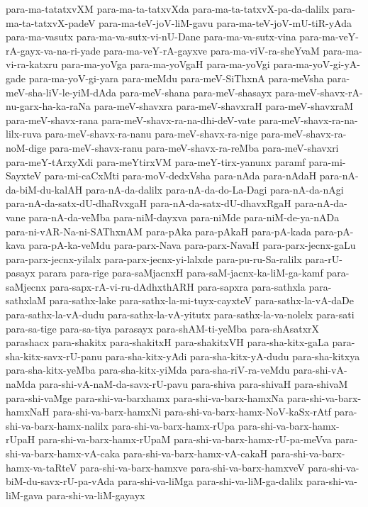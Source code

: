 {para-ma-tatatxvXM
para-ma-ta-tatxvXda
para-ma-ta-tatxvX-pa-da-dalilx
para-ma-ta-tatxvX-padeV
para-ma-teV-joV-liM-gavu
para-ma-teV-joV-mU-tiR-yAda
para-ma-vasutx
para-ma-va-sutx-vi-nU-Dane
para-ma-va-sutx-vina
para-ma-veY-rA-gayx-va-na-ri-yade
para-ma-veY-rA-gayxve
para-ma-viV-ra-sheYvaM
para-ma-vi-ra-katxru
para-ma-yoVga
para-ma-yoVgaH
para-ma-yoVgi
para-ma-yoV-gi-yA-gade
para-ma-yoV-gi-yara
para-meMdu
para-meV-SiThxnA
para-meVsha
para-meV-sha-liV-le-yiM-dAda
para-meV-shana
para-meV-shasayx
para-meV-shavx-rA-nu-garx-ha-ka-raNa
para-meV-shavxra
para-meV-shavxraH
para-meV-shavxraM
para-meV-shavx-rana
para-meV-shavx-ra-na-dhi-deV-vate
para-meV-shavx-ra-na-lilx-ruva
para-meV-shavx-ra-nanu
para-meV-shavx-ra-nige
para-meV-shavx-ra-noM-dige
para-meV-shavx-ranu
para-meV-shavx-ra-reMba
para-meV-shavxri
para-meY-tArxyXdi
para-meYtirxVM
para-meY-tirx-yanunx
paramf
para-mi-SayxteV
para-mi-caCxMti
para-moV-dedxVsha
para-nAda
para-nAdaH
para-nA-da-biM-du-kalAH
para-nA-da-dalilx
para-nA-da-do-La-Dagi
para-nA-da-nAgi
para-nA-da-satx-dU-dhaRvxgaH
para-nA-da-satx-dU-dhavxRgaH
para-nA-da-vane
para-nA-da-veMba
para-niM-dayxva
para-niMde
para-niM-de-ya-nADa
para-ni-vAR-Na-ni-SAThxnAM
para-pAka
para-pAkaH
para-pA-kada
para-pA-kava
para-pA-ka-veMdu
para-parx-Nava
para-parx-NavaH
para-parx-jecnx-gaLu
para-parx-jecnx-yilalx
para-parx-jecnx-yi-lalxde
para-pu-ru-Sa-ralilx
para-rU-pasayx
parara
para-rige
para-saMjacnxH
para-saM-jacnx-ka-liM-ga-kamf
para-saMjecnx
para-sapx-rA-vi-ru-dAdhxthARH
para-sapxra
para-sathxla
para-sathxlaM
para-sathx-lake
para-sathx-la-mi-tuyx-cayxteV
para-sathx-la-vA-daDe
para-sathx-la-vA-dudu
para-sathx-la-vA-yitutx
para-sathx-la-va-nolelx
para-sati
para-sa-tige
para-sa-tiya
parasayx
para-shAM-ti-yeMba
para-shAsatxrX
parashacx
para-shakitx
para-shakitxH
para-shakitxVH
para-sha-kitx-gaLa
para-sha-kitx-savx-rU-panu
para-sha-kitx-yAdi
para-sha-kitx-yA-dudu
para-sha-kitxya
para-sha-kitx-yeMba
para-sha-kitx-yiMda
para-sha-riV-ra-veMdu
para-shi-vA-naMda
para-shi-vA-naM-da-savx-rU-pavu
para-shiva
para-shivaH
para-shivaM
para-shi-vaMge
para-shi-va-barxhamx
para-shi-va-barx-hamxNa
para-shi-va-barx-hamxNaH
para-shi-va-barx-hamxNi
para-shi-va-barx-hamx-NoV-kaSx-rAtf
para-shi-va-barx-hamx-nalilx
para-shi-va-barx-hamx-rUpa
para-shi-va-barx-hamx-rUpaH
para-shi-va-barx-hamx-rUpaM
para-shi-va-barx-hamx-rU-pa-meVva
para-shi-va-barx-hamx-vA-caka
para-shi-va-barx-hamx-vA-cakaH
para-shi-va-barx-hamx-va-taRteV
para-shi-va-barx-hamxve
para-shi-va-barx-hamxveV
para-shi-va-biM-du-savx-rU-pa-vAda
para-shi-va-liMga
para-shi-va-liM-ga-dalilx
para-shi-va-liM-gava
para-shi-va-liM-gayayx
}

